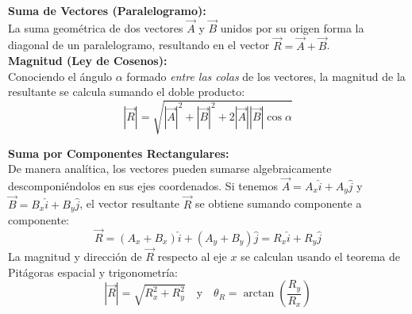 \documentclass[11pt,twoside]{article}
\begin{document}
\vspace{0.4cm}
\begin{minipage}{0.5\textwidth}
\textbf{Suma de Vectores (Paralelogramo):} \\
La suma geométrica de dos vectores $\vec{A}$ y $\vec{B}$ unidos por su origen forma la diagonal de un paralelogramo, resultando en el vector $\vec{R} = \vec{A} + \vec{B}$. \\

\textbf{Magnitud (Ley de Cosenos):} \\
Conociendo el ángulo $\alpha$ formado \textit{entre las colas} de los vectores, la magnitud de la resultante se calcula sumando el doble producto:
$$ |\vec{R}| = \sqrt{|\vec{A}|^2 + |\vec{B}|^2 + 2|\vec{A}||\vec{B}|\cos\alpha} $$
\end{minipage}%
\begin{minipage}{0.5\textwidth}
\begin{center}
\end{center}
\end{minipage}

\vspace{0.4cm}
\begin{minipage}{\textwidth}
\textbf{Suma por Componentes Rectangulares:} \\
De manera analítica, los vectores pueden sumarse algebraicamente descomponiéndolos en sus ejes coordenados. Si tenemos $\vec{A} = A_x\hat{i} + A_y\hat{j}$ y $\vec{B} = B_x\hat{i} + B_y\hat{j}$, el vector resultante $\vec{R}$ se obtiene sumando componente a componente:
$$ \vec{R} = (A_x + B_x)\hat{i} + (A_y + B_y)\hat{j} = R_x\hat{i} + R_y\hat{j} $$
La magnitud y dirección de $\vec{R}$ respecto al eje $x$ se calculan usando el teorema de Pitágoras espacial y trigonometría:
$$ |\vec{R}| = \sqrt{R_x^2 + R_y^2} \quad \text{y} \quad \theta_R = \arctan\left(\frac{R_y}{R_x}\right) $$
\end{minipage}
\end{document}
